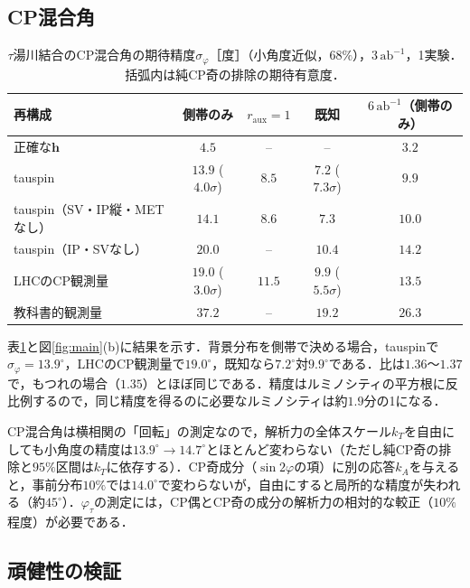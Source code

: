 \documentclass[paper=a4,fontsize=10pt,jafontsize=10pt,line_length=44zw,number_of_lines=46]{jlreq}
\newcommand{\abinv}{\,\mathrm{ab}^{-1}}
\newcommand{\hvec}{\boldsymbol{h}}
\begin{document}
\subsection{CP混合角}

\begin{table}[t]
  \centering
  \caption{$\tau$湯川結合のCP混合角の期待精度$\sigma_\varphi$［度］（小角度近似，$68\%$），$3\abinv$，1実験．括弧内は純CP奇の排除の期待有意度．}
  \label{tab:cp}
  \begin{tabular}{lcccc}
    \toprule
    再構成 & 側帯のみ & $r_{\mathrm{aux}}=1$ & 既知 & $6\abinv$（側帯のみ） \\
    \midrule
    正確な$\hvec$ & $4.5$ & -- & -- & $3.2$ \\
    tauspin & $13.9$ ($4.0\sigma$) & $8.5$ & $7.2$ ($7.3\sigma$) & $9.9$ \\
    tauspin（SV・IP縦・METなし） & $14.1$ & $8.6$ & $7.3$ & $10.0$ \\
    tauspin（IP・SVなし） & $20.0$ & -- & $10.4$ & $14.2$ \\
    LHCのCP観測量 & $19.0$ ($3.0\sigma$) & $11.5$ & $9.9$ ($5.5\sigma$) & $13.5$ \\
    教科書的観測量 & $37.2$ & -- & $19.2$ & $26.3$ \\
    \bottomrule
  \end{tabular}
\end{table}

表\ref{tab:cp}と図\ref{fig:main}(b)に結果を示す．背景分布を側帯で決める場合，tauspinで$\sigma_\varphi=13.9^\circ$，LHCのCP観測量で$19.0^\circ$，既知なら$7.2^\circ$対$9.9^\circ$である．比は$1.36$〜$1.37$で，もつれの場合（$1.35$）とほぼ同じである．精度はルミノシティの平方根に反比例するので，同じ精度を得るのに必要なルミノシティは約$1.9$分の1になる．

CP混合角は横相関の「回転」の測定なので，解析力の全体スケール$k_T$を自由にしても小角度の精度は$13.9^\circ\to14.7^\circ$とほとんど変わらない（ただし純CP奇の排除と$95\%$区間は$k_T$に依存する）．CP奇成分（$\sin2\varphi$の項）に別の応答$k_A$を与えると，事前分布$10\%$では$14.0^\circ$で変わらないが，自由にすると局所的な精度が失われる（約$45^\circ$）．$\varphi_\tau$の測定には，CP偶とCP奇の成分の解析力の相対的な較正（$10\%$程度）が必要である．

\subsection{頑健性の検証}
\end{document}
